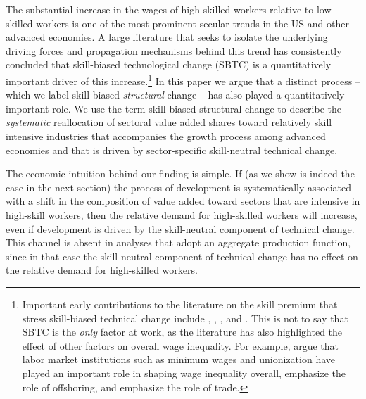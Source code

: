 \documentclass[12pt,english]{article}
\begin{document}
The substantial increase in the wages of high-skilled workers relative to
low-skilled workers is one of the most prominent secular trends in the US
and other advanced economies. A large literature that seeks to isolate the
underlying driving forces and propagation mechanisms behind this trend has
consistently concluded that skill-biased technological change (SBTC) is a
quantitatively important driver of this increase.\footnote{%
Important early contributions to the literature on the skill premium that
stress skill-biased technical change include \citet{KatMur92}, %
\citet{BouJoh92}, \citet{MurWel92}, \citet{BBG94} and \citet{BBM98}. This is
not to say that SBTC is the \emph{only} factor at work, as the literature
has also highlighted the effect of other factors on overall wage inequality.
For example, \citet{DFL96} argue that labor market institutions such as
minimum wages and unionization have played an important role in shaping wage
inequality overall, \citet{FeeHan99} emphasize the role of offshoring, and %
\citet{ADH13} emphasize the role of trade.} In this paper we argue that a
distinct process -- which we label skill-biased \emph{structural} change --
has also played a quantitatively important role. We use the term skill
biased structural change to describe the \emph{systematic} reallocation of
sectoral value added shares toward relatively skill intensive industries
that accompanies the growth process among advanced economies and that is
driven by sector-specific skill-neutral technical change.

The economic intuition behind our finding is simple. If (as we show is
indeed the case in the next section) the process of development is
systematically associated with a shift in the composition of value added
toward sectors that are intensive in high-skill workers, then the relative
demand for high-skilled workers will increase, even if development is driven
by the skill-neutral component of technical change. This channel is absent
in analyses that adopt an aggregate production function, since in that case
the skill-neutral component of technical change has no effect on the
relative demand for high-skilled workers.
\end{document}
